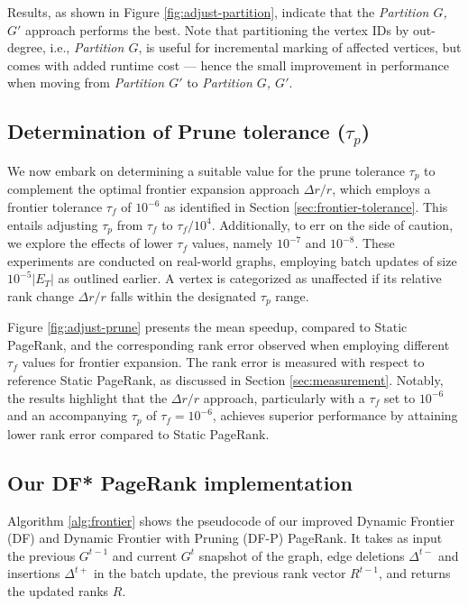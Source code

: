 Results, as shown in Figure \ref{fig:adjust-partition}, indicate that the \textit{Partition $G$, $G'$} approach performs the best. Note that partitioning the vertex IDs by out-degree, i.e., \textit{Partition $G$}, is useful for incremental marking of affected vertices, but comes with added runtime cost --- hence the small improvement in performance when moving from \textit{Partition $G'$} to \textit{Partition $G$, $G'$}.










\subsection{Determination of Prune tolerance ($\tau_p$)}
\label{sec:prune-tolerance}

We now embark on determining a suitable value for the prune tolerance $\tau_p$ to complement the optimal frontier expansion approach $\Delta r/r$, which employs a frontier tolerance $\tau_f$ of $10^{-6}$ as identified in Section \ref{sec:frontier-tolerance}. This entails adjusting $\tau_p$ from $\tau_f$ to $\tau_f/10^4$. Additionally, to err on the side of caution, we explore the effects of lower $\tau_f$ values, namely $10^{-7}$ and $10^{-8}$. These experiments are conducted on real-world graphs, employing batch updates of size $10^{-5}|E_T|$ as outlined earlier. A vertex is categorized as unaffected if its relative rank change $\Delta r/r$ falls within the designated $\tau_p$ range.

Figure \ref{fig:adjust-prune} presents the mean speedup, compared to Static PageRank, and the corresponding rank error observed when employing different $\tau_f$ values for frontier expansion. The rank error is measured with respect to reference Static PageRank, as discussed in Section \ref{sec:measurement}. Notably, the results highlight that the $\Delta r/r$ approach, particularly with a $\tau_f$ set to $10^{-6}$ and an accompanying $\tau_p$ of $\tau_f = 10^{-6}$, achieves superior performance by attaining lower rank error compared to Static PageRank.




\subsection{Our DF* PageRank implementation}

Algorithm \ref{alg:frontier} shows the pseudocode of our improved Dynamic Frontier (DF) and Dynamic Frontier with Pruning (DF-P) PageRank. It takes as input the previous $G^{t-1}$ and current $G^t$ snapshot of the graph, edge deletions $\Delta^{t-}$ and insertions $\Delta^{t+}$ in the batch update, the previous rank vector $R^{t-1}$, and returns the updated ranks $R$.

